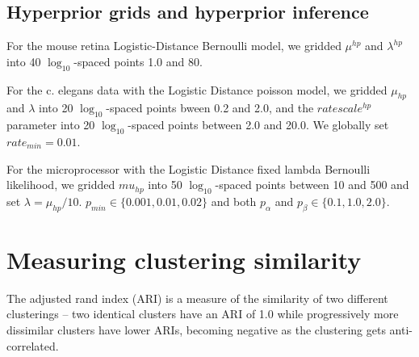 \documentclass{article}
\begin{document}
\subsection*{Hyperprior grids and hyperprior inference}
\label{supp:hyperpriors}

For the mouse retina Logistic-Distance Bernoulli model, we gridded
$\mu^{hp}$ and $\lambda^{hp}$ into 40 $\log_{10}$-spaced points 1.0
and 80. 

For the c. elegans data with the Logistic Distance poisson model, we
gridded $\mu_{hp}$ and $\lambda$ into 20 $\log_{10}$-spaced points
bween 0.2 and 2.0, and the $ratescale^{hp}$ parameter into 20
$\log_{10}$-spaced points between 2.0 and 20.0. We globally set
$rate_{min}=0.01$.

For the microprocessor with the Logistic Distance fixed lambda
Bernoulli likelihood, we gridded $mu_{hp}$ into 50 $\log_{10}$-spaced
points between 10 and 500 and set $\lambda=\mu_{hp}/10$. $p_{min} \in
\{0.001, 0.01, 0.02\}$ and both $p_\alpha$ and $p_\beta \in \{0.1,
1.0, 2.0\}$.

\section*{Measuring clustering similarity}

The adjusted rand index (ARI) is a measure of the similarity of two
different clusterings \autocite{Hubert1985} -- two identical clusters
have an ARI of 1.0 while progressively more dissimilar clusters have
lower ARIs, becoming negative as the clustering gets anti-correlated.
\end{document}
